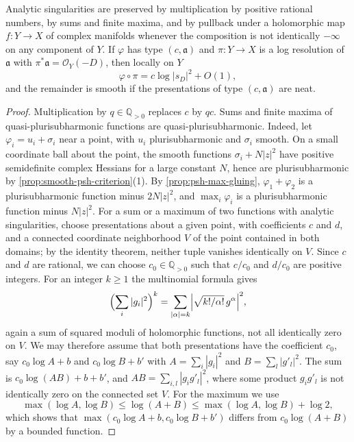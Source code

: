 \begin{proposition}\label{prop:rational-analytic-operations}
Analytic singularities are preserved by multiplication by positive rational numbers, by sums and finite maxima, and by pullback under a holomorphic map $f\colon Y\to X$ of complex manifolds whenever the composition is not identically $-\infty$ on any component of $Y$. If $\varphi$ has type $(c,\mathfrak a)$ and $\pi\colon Y\to X$ is a log resolution of $\mathfrak a$ with $\pi^*\mathfrak a=\mathcal O_Y(-D)$, then locally on $Y$
\[
 \varphi\circ\pi=c\log|s_D|^2+O(1),
\]
and the remainder is smooth if the presentations of type $(c,\mathfrak a)$ are neat.
\end{proposition}
\begin{proof}
Multiplication by $q\in\mathbb Q_{>0}$ replaces $c$ by $qc$. Sums and finite maxima of quasi-plurisubharmonic functions are quasi-plurisubharmonic. Indeed, let $\varphi_i=u_i+\sigma_i$ near a point, with $u_i$ plurisubharmonic and $\sigma_i$ smooth. On a small coordinate ball about the point, the smooth functions $\sigma_i+N|z|^2$ have positive semidefinite complex Hessians for a large constant $N$, hence are plurisubharmonic by \cref{prop:smooth-psh-criterion}(1). By \cref{prop:psh-max-gluing}, $\varphi_1+\varphi_2$ is a plurisubharmonic function minus $2N|z|^2$, and $\max_i\varphi_i$ is a plurisubharmonic function minus $N|z|^2$. For a sum or a maximum of two functions with analytic singularities, choose presentations about a given point, with coefficients $c$ and $d$, and a connected coordinate neighborhood $V$ of the point contained in both domains; by the identity theorem, neither tuple vanishes identically on $V$. Since $c$ and $d$ are rational, we can choose $c_0\in\mathbb Q_{>0}$ such that $c/c_0$ and $d/c_0$ are positive integers. For an integer $k\geq1$ the multinomial formula gives
\[
 \Bigl(\sum_i|g_i|^2\Bigr)^k=\sum_{|\alpha|=k}\Bigl|\sqrt{k!/\alpha!}\,g^\alpha\Bigr|^2,
\]
again a sum of squared moduli of holomorphic functions, not all identically zero on $V$. We may therefore assume that both presentations have the coefficient $c_0$, say $c_0\log A+b$ and $c_0\log B+b'$ with $A=\sum_i|g_i|^2$ and $B=\sum_l|g'_l|^2$. The sum is $c_0\log(AB)+b+b'$, and $AB=\sum_{i,l}|g_ig'_l|^2$, where some product $g_ig'_l$ is not identically zero on the connected set $V$. For the maximum we use
\[
 \max(\log A,\log B)\leq\log(A+B)\leq\max(\log A,\log B)+\log2,
\]
which shows that $\max(c_0\log A+b,c_0\log B+b')$ differs from $c_0\log(A+B)$ by a bounded function.


\end{proof}
